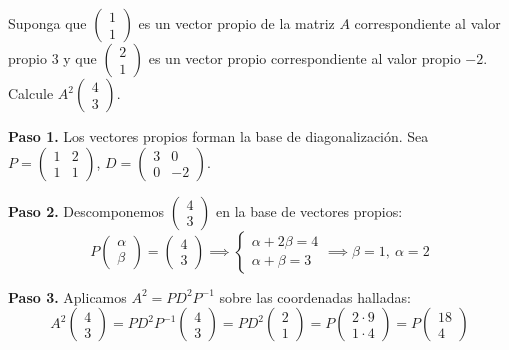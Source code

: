 \begin{prob}
Suponga que $\begin{pmatrix} 1 \\ 1 \end{pmatrix}$ es un vector propio de la matriz $A$ correspondiente al valor propio $3$ y que $\begin{pmatrix} 2 \\ 1 \end{pmatrix}$ es un vector propio correspondiente al valor propio $-2$. Calcule $A^{2}\begin{pmatrix} 4 \\ 3 \end{pmatrix}$.
\begin{myproof}
\textbf{Paso 1.} Los vectores propios forman la base de diagonalización. Sea $P = \begin{pmatrix} 1 & 2 \\ 1 & 1 \end{pmatrix}$, $D = \begin{pmatrix} 3 & 0 \\ 0 & -2 \end{pmatrix}$.

\textbf{Paso 2.} Descomponemos $\begin{pmatrix} 4 \\ 3 \end{pmatrix}$ en la base de vectores propios:
\[
P \begin{pmatrix} \alpha \\ \beta \end{pmatrix} = \begin{pmatrix} 4 \\ 3 \end{pmatrix}
\implies
\begin{cases}
\alpha + 2\beta = 4 \\
\alpha + \beta = 3
\end{cases}
\implies \beta = 1, \ \alpha = 2
\]

\textbf{Paso 3.} Aplicamos $A^2 = PD^2P^{-1}$ sobre las coordenadas halladas:
\[
A^2\begin{pmatrix} 4 \\ 3 \end{pmatrix} = P D^2 P^{-1} \begin{pmatrix} 4 \\ 3 \end{pmatrix} = P D^2 \begin{pmatrix} 2 \\ 1 \end{pmatrix} = P \begin{pmatrix} 2\cdot 9 \\ 1\cdot 4 \end{pmatrix} = P \begin{pmatrix} 18 \\ 4 \end{pmatrix}
\]


\end{myproof}
\end{prob}
